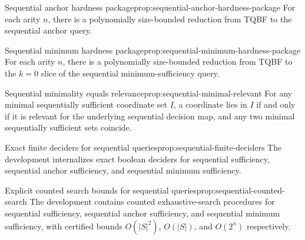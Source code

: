
\begin{claim}{Sequential anchor hardness package}{prop:sequential-anchor-hardness-package}
For each arity $n$, there is a polynomially size-bounded reduction from TQBF to the sequential anchor query.
\end{claim}


\begin{claim}{Sequential minimum hardness package}{prop:sequential-minimum-hardness-package}
For each arity $n$, there is a polynomially size-bounded reduction from TQBF to
the $k=0$ slice of the sequential minimum-sufficiency query.
\end{claim}


\begin{claim}{Sequential minimality equals relevance}{prop:sequential-minimal-relevant}
For any minimal sequentially sufficient coordinate set $I$, a coordinate lies in
$I$ if and only if it is relevant for the underlying sequential decision map,
and any two minimal sequentially sufficient sets coincide.
\end{claim}


\begin{claim}{Exact finite deciders for sequential queries}{prop:sequential-finite-deciders}
The development internalizes exact boolean deciders for sequential sufficiency,
sequential anchor sufficiency, and sequential minimum sufficiency.
\end{claim}


\begin{claim}{Explicit counted search bounds for sequential queries}{prop:sequential-counted-search}
The development contains counted exhaustive-search procedures for sequential
sufficiency, sequential anchor sufficiency, and sequential minimum sufficiency,
with certified bounds $O(|S|^2)$, $O(|S|)$, and $O(2^n)$ respectively.
\end{claim}

